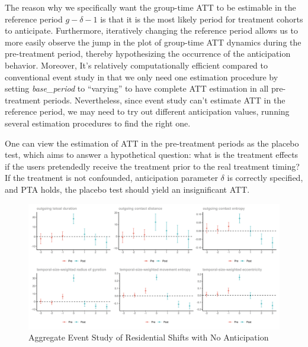 The reason why we specifically want the group-time ATT to be estimable in the reference period \( g-\delta-1 \)	 is that it is the most likely period for treatment cohorts to anticipate.
Furthermore, iteratively changing the reference period allows us to more easily observe the jump in the plot of group-time ATT dynamics during the pre-treatment period, thereby hypothesizing the occurrence of the anticipation behavior.
Moreover, It's relatively computationally efficient compared to conventional event study in that we only need one estimation procedure by setting \textit{base\_period} to ``varying'' to have complete ATT estimation in all pre-treatment periods.
Nevertheless, since event study can't estimate ATT in the reference period, we may need to try out different anticipation values, running several estimation procedures to find the right one.

One can view the estimation of ATT in the pre-treatment periods as the placebo test, which aims to answer a hypothetical question: what is the treatment effects if the users pretendedly receive the treatment prior to the real treatment timing?
If the treatment is not confounded, anticipation parameter $\delta$ is correctly specified, and PTA holds, the placebo test should yield an insignificant ATT.

\begin{figure}[h!]
\centering
\caption{Aggregate Event Study of Residential Shifts with No Anticipation}
\vspace{0.1cm}

\includegraphics[width=1\textwidth]{figures/csdid/inspect_delta/residential_shift.png}

\label{fig:select_delta_residential_shift}
\end{figure}

